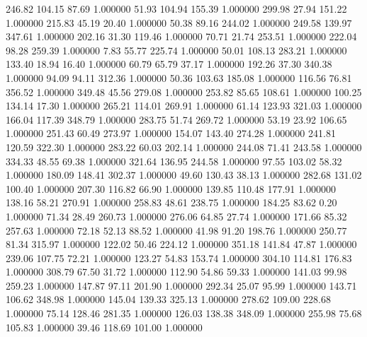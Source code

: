    246.82    104.15     87.69  1.000000
     51.93    104.94    155.39  1.000000
    299.98     27.94    151.22  1.000000
    215.83     45.19     20.40  1.000000
     50.38     89.16    244.02  1.000000
    249.58    139.97    347.61  1.000000
    202.16     31.30    119.46  1.000000
     70.71     21.74    253.51  1.000000
    222.04     98.28    259.39  1.000000
      7.83     55.77    225.74  1.000000
     50.01    108.13    283.21  1.000000
    133.40     18.94     16.40  1.000000
     60.79     65.79     37.17  1.000000
    192.26     37.30    340.38  1.000000
     94.09     94.11    312.36  1.000000
     50.36    103.63    185.08  1.000000
    116.56     76.81    356.52  1.000000
    349.48     45.56    279.08  1.000000
    253.82     85.65    108.61  1.000000
    100.25    134.14     17.30  1.000000
    265.21    114.01    269.91  1.000000
     61.14    123.93    321.03  1.000000
    166.04    117.39    348.79  1.000000
    283.75     51.74    269.72  1.000000
     53.19     23.92    106.65  1.000000
    251.43     60.49    273.97  1.000000
    154.07    143.40    274.28  1.000000
    241.81    120.59    322.30  1.000000
    283.22     60.03    202.14  1.000000
    244.08     71.41    243.58  1.000000
    334.33     48.55     69.38  1.000000
    321.64    136.95    244.58  1.000000
     97.55    103.02     58.32  1.000000
    180.09    148.41    302.37  1.000000
     49.60    130.43     38.13  1.000000
    282.68    131.02    100.40  1.000000
    207.30    116.82     66.90  1.000000
    139.85    110.48    177.91  1.000000
    138.16     58.21    270.91  1.000000
    258.83     48.61    238.75  1.000000
    184.25     83.62      0.20  1.000000
     71.34     28.49    260.73  1.000000
    276.06     64.85     27.74  1.000000
    171.66     85.32    257.63  1.000000
     72.18     52.13     88.52  1.000000
     41.98     91.20    198.76  1.000000
    250.77     81.34    315.97  1.000000
    122.02     50.46    224.12  1.000000
    351.18    141.84     47.87  1.000000
    239.06    107.75     72.21  1.000000
    123.27     54.83    153.74  1.000000
    304.10    114.81    176.83  1.000000
    308.79     67.50     31.72  1.000000
    112.90     54.86     59.33  1.000000
    141.03     99.98    259.23  1.000000
    147.87     97.11    201.90  1.000000
    292.34     25.07     95.99  1.000000
    143.71    106.62    348.98  1.000000
    145.04    139.33    325.13  1.000000
    278.62    109.00    228.68  1.000000
     75.14    128.46    281.35  1.000000
    126.03    138.38    348.09  1.000000
    255.98     75.68    105.83  1.000000
     39.46    118.69    101.00  1.000000
